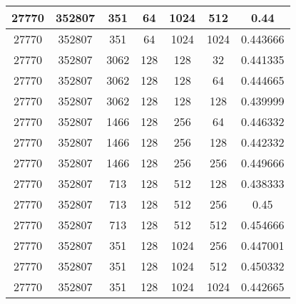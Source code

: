 \documentclass[9pt]{article}
\begin{document}
\begin{tabular}{|c|c|c|c|c|c|c| }
\hline
27770  & 352807  & 351  & 64  & 1024  & 512  & 0.44 \\
\hline
27770  & 352807  & 351  & 64  & 1024  & 1024  & 0.443666 \\
\hline
27770  & 352807  & 3062  & 128  & 128  & 32  & 0.441335 \\
\hline
27770  & 352807  & 3062  & 128  & 128  & 64  & 0.444665 \\
\hline
27770  & 352807  & 3062  & 128  & 128  & 128  & 0.439999 \\
\hline
27770  & 352807  & 1466  & 128  & 256  & 64  & 0.446332 \\
\hline
27770  & 352807  & 1466  & 128  & 256  & 128  & 0.442332 \\
\hline
27770  & 352807  & 1466  & 128  & 256  & 256  & 0.449666 \\
\hline
27770  & 352807  & 713  & 128  & 512  & 128  & 0.438333 \\
\hline
27770  & 352807  & 713  & 128  & 512  & 256  & 0.45 \\
\hline
27770  & 352807  & 713  & 128  & 512  & 512  & 0.454666 \\
\hline
27770  & 352807  & 351  & 128  & 1024  & 256  & 0.447001 \\
\hline
27770  & 352807  & 351  & 128  & 1024  & 512  & 0.450332 \\
\hline
27770  & 352807  & 351  & 128  & 1024  & 1024  & 0.442665 \\
\hline
\end{tabular}
 
\end{document}

